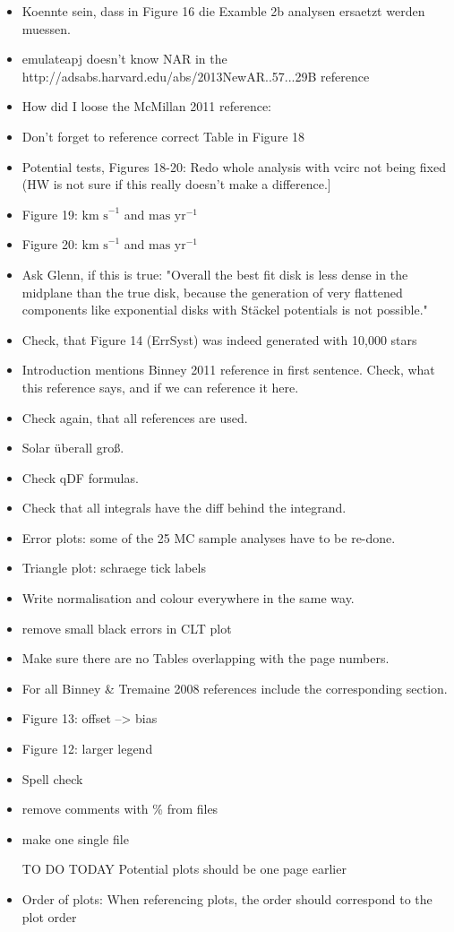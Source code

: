 \begin{itemize}
\item Koennte sein, dass in Figure 16 die Examble 2b analysen ersaetzt werden muessen.
\item emulateapj doesn't know NAR in the http://adsabs.harvard.edu/abs/2013NewAR..57...29B reference
\item How did I loose the McMillan 2011 reference: %
\item Don't forget to reference correct Table in Figure 18
\item Potential tests, Figures 18-20: Redo whole analysis with vcirc not being fixed (HW is not sure if this really doesn't make a difference.]
\item Figure 19: $\text{km s}^{-1}$ and $\text{mas yr}^{-1}$
\item Figure 20: $\text{km s}^{-1}$ and $\text{mas yr}^{-1}$
\item Ask Glenn, if this is true: "Overall the best fit disk is less dense in the midplane than the true disk, because the generation of very flattened components like exponential disks with St\"{a}ckel potentials is not possible."
\item Check, that Figure 14 (ErrSyst) was indeed generated with 10,000 stars
\item Introduction mentions Binney 2011 reference in first sentence. Check, what this reference says, and if we can reference it here.
\item Check again, that all references are used.
\item Solar überall groß.
\item Check qDF formulas.
\item Check that all integrals have the diff behind the integrand.
\item Error plots: some of the 25 MC sample analyses have to be re-done.
\item Triangle plot: schraege tick labels
\item Write normalisation and colour everywhere in the same way.
\item remove small black errors in CLT plot
\item Make sure there are no Tables overlapping with the page numbers.
\item For all Binney \& Tremaine 2008 references include the corresponding section.
\item Figure 13: offset --> bias
\item Figure 12: larger legend
\item Spell check
\item remove comments with \% from files
\item make one single file
\item [TO DO TODAY] Potential plots should be one page earlier
\item Order of plots: When referencing plots, the order should correspond to the plot order
\end{itemize}

